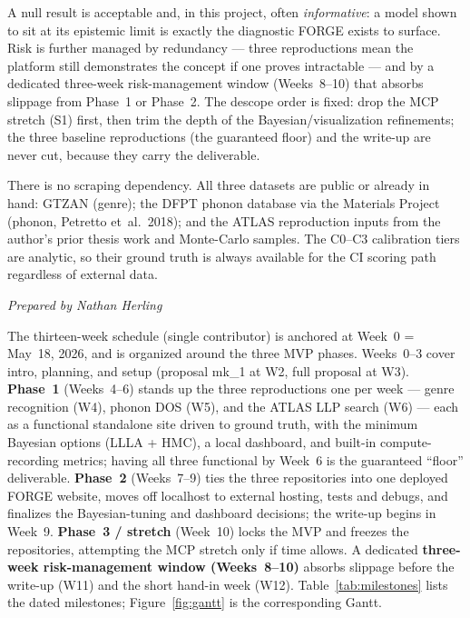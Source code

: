 \documentclass[11pt]{article}
\newcommand{\preparedby}{%
  \par\nobreak\vspace{-6pt}%
  {\footnotesize\itshape\color{forgemute}Prepared by Nathan Herling}%
  \par\vspace{4pt}}
\begin{document}
A null result is acceptable and, in this project, often \emph{informative}: a model shown to sit at its epistemic limit is exactly the diagnostic FORGE exists to surface. Risk is further managed by redundancy --- three reproductions mean the platform still demonstrates the concept if one proves intractable --- and by a dedicated three-week risk-management window (Weeks~8--10) that absorbs slippage from Phase~1 or Phase~2. The descope order is fixed: drop the MCP stretch (S1) first, then trim the depth of the Bayesian/visualization refinements; the three baseline reproductions (the guaranteed floor) and the write-up are never cut, because they carry the deliverable.

There is no scraping dependency. All three datasets are public or already in hand: GTZAN (genre); the DFPT phonon database via the Materials Project (phonon, Petretto et~al.\ 2018); and the ATLAS reproduction inputs from the author's prior thesis work and Monte-Carlo samples. The C0--C3 calibration tiers are analytic, so their ground truth is always available for the CI scoring path regardless of external data.

\preparedby

The thirteen-week schedule (single contributor) is anchored at Week~0 = May~18, 2026, and is organized around the three MVP phases. Weeks~0--3 cover intro, planning, and setup (proposal mk\_1 at W2, full proposal at W3). \textbf{Phase~1} (Weeks~4--6) stands up the three reproductions one per week --- genre recognition (W4), phonon DOS (W5), and the ATLAS LLP search (W6) --- each as a functional standalone site driven to ground truth, with the minimum Bayesian options (LLLA + HMC), a local dashboard, and built-in compute-recording metrics; having all three functional by Week~6 is the guaranteed ``floor'' deliverable. \textbf{Phase~2} (Weeks~7--9) ties the three repositories into one deployed FORGE website, moves off localhost to external hosting, tests and debugs, and finalizes the Bayesian-tuning and dashboard decisions; the write-up begins in Week~9. \textbf{Phase~3 / stretch} (Week~10) locks the MVP and freezes the repositories, attempting the MCP stretch only if time allows. A dedicated \textbf{three-week risk-management window (Weeks~8--10)} absorbs slippage before the write-up (W11) and the short hand-in week (W12). Table~\ref{tab:milestones} lists the dated milestones; Figure~\ref{fig:gantt} is the corresponding Gantt.
\end{document}
